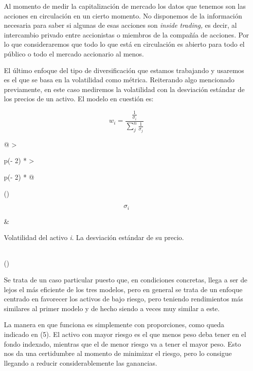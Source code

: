 \documentclass[
]{article}
\begin{document}
Al momento de medir la capitalización de mercado los datos que tenemos
son las acciones en circulación en un cierto momento. No disponemos de
la información necesaria para saber si algunas de esas acciones son
\emph{inside trading,} es decir, al intercambio privado entre
accionistas o miembros de la compañía de acciones\emph{.} Por lo que
consideraremos que todo lo que está en circulación es abierto para todo
el público o todo el mercado accionario al menos.

El último enfoque del tipo de diversificación que estamos trabajando y
usaremos es el que se basa en la volatilidad como métrica. Reiterando
algo mencionado previamente, en este caso mediremos la volatilidad con
la desviación estándar de los precios de un activo. El modelo en
cuestión es:

\begin{equation}
w_{i} = \frac{\frac{1}{\sigma_{i}}}{\sum_{j}^{n}\frac{1}{\sigma_{j}}}  
\end{equation}

\begin{longtable}[]{@{}
>{\raggedright\arraybackslash}p{(\columnwidth - 2\tabcolsep) * }
>{\raggedright\arraybackslash}p{(\columnwidth - 2\tabcolsep) * }@{}}
\toprule()
\begin{minipage}[b]{\linewidth}\raggedright
\[\sigma_{i}\]
\end{minipage} & \begin{minipage}[b]{\linewidth}\raggedright
Volatilidad del activo \emph{i}. La desviación estándar de su precio.
\end{minipage} \\
\endhead
\bottomrule()
\caption{Descripción de las variables del \textit{benchmark} de la volatilidad.}
\end{longtable}

Se trata de un caso particular puesto que, en condiciones concretas,
llega a ser de lejos el más eficiente de los tres modelos, pero en general
se trata de un enfoque centrado en favorecer los activos de bajo riesgo,
pero teniendo rendimientos más similares al primer modelo y de hecho
siendo a veces muy similar a este.

La manera en que funciona es simplemente con proporciones, como queda indicado en (5). El activo con
mayor riesgo es el que menos peso deba tener en el fondo indexado,
mientras que el de menor riesgo va a tener el mayor peso. Esto nos da
una certidumbre al momento de minimizar el riesgo, pero lo consigue
llegando a reducir considerablemente las ganancias.
\end{document}
